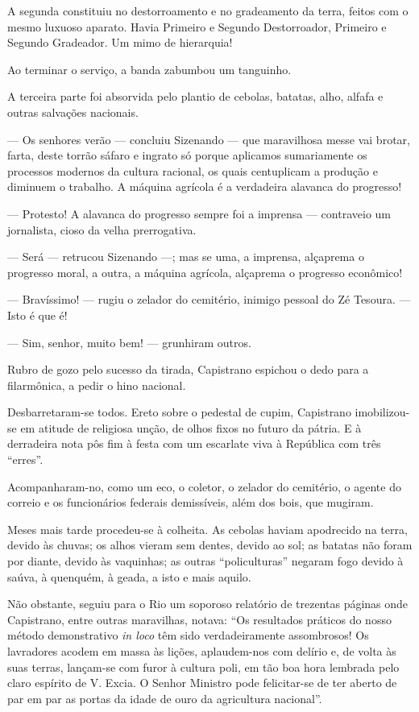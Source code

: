A segunda constituiu no destorroamento e no gradeamento da terra, feitos
com o mesmo luxuoso aparato. Havia Primeiro e Segundo Destorroador,
Primeiro e Segundo Gradeador. Um mimo de hierarquia!

Ao terminar o serviço, a banda zabumbou um tanguinho.

A terceira parte foi absorvida pelo plantio de cebolas, batatas, alho,
alfafa e outras salvações nacionais.

--- Os senhores verão --- concluiu Sizenando --- que maravilhosa messe
vai brotar, farta, deste torrão sáfaro e ingrato só porque aplicamos
sumariamente os processos modernos da cultura racional, os quais
centuplicam a produção e diminuem o trabalho. A máquina agrícola é a
verdadeira alavanca do progresso!

--- Protesto! A alavanca do progresso sempre foi a imprensa ---
contraveio um jornalista, cioso da velha prerrogativa.

--- Será --- retrucou Sizenando ---; mas se uma, a imprensa, alçaprema o
progresso moral, a outra, a máquina agrícola, alçaprema o progresso
econômico!

--- Bravíssimo! --- rugiu o zelador do cemitério, inimigo pessoal do Zé
Tesoura. --- Isto é que é!

--- Sim, senhor, muito bem! --- grunhiram outros.

Rubro de gozo pelo sucesso da tirada, Capistrano espichou o dedo para a
filarmônica, a pedir o hino nacional.

Desbarretaram-se todos. Ereto sobre o pedestal de cupim, Capistrano
imobilizou-se em atitude de religiosa unção, de olhos fixos no futuro da
pátria. E à derradeira nota pôs fim à festa com um escarlate viva à
República com três ``erres''.

Acompanharam-no, como um eco, o coletor, o zelador do cemitério, o
agente do correio e os funcionários federais demissíveis, além dos bois,
que mugiram.

Meses mais tarde procedeu-se à colheita. As cebolas haviam apodrecido na
terra, devido às chuvas; os alhos vieram sem dentes, devido ao sol; as
batatas não foram por diante, devido às vaquinhas; as outras
``policulturas'' negaram fogo devido à saúva, à quenquém, à geada, a
isto e mais aquilo.

Não obstante, seguiu para o Rio um soporoso relatório de trezentas
páginas onde Capistrano, entre outras maravilhas, notava: ``Os
resultados práticos do nosso método demonstrativo \emph{in loco} têm
sido verdadeiramente assombrosos! Os lavradores acodem em massa às
lições, aplaudem-nos com delírio e, de volta às suas terras, lançam-se
com furor à cultura poli, em tão boa hora lembrada pelo claro espírito
de V. Excia. O Senhor Ministro pode felicitar-se de ter aberto de par em
par as portas da idade de ouro da agricultura nacional''.

